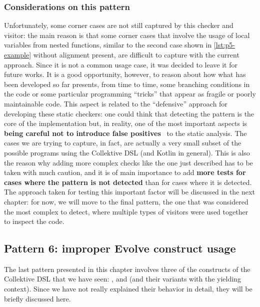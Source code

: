 \documentclass[12pt,a4paper,openright,twoside]{book}
\begin{document}
\subsubsection{Considerations on this pattern}

Unfortunately, some corner cases are not still captured by this checker and
visitor: the main reason is that some corner cases that involve the usage of
local variables from nested functions, similar to the second case shown in
\cref{lst:p5-example} without alignment present, are difficult to capture with
the current approach. Since it is not a common usage case, it was decided to
leave it for future works. It is a good opportunity, however, to reason about
how what has been developed so far presents, from time to time, some
branching conditions in the code or some particular programming ``tricks'' that
appear as fragile or poorly maintainable code. 
%
This aspect is related to the ``defensive'' approach for developing these static
checkers: one could think that detecting the pattern is the core of the
implementation but, in reality, one of the most important aspects is
\textbf{being careful not to introduce false
positives}~\cite{DBLP:journals/jss/LenarduzziPSLP23} to the static analysis.
%
The cases we are trying to capture, in fact, are actually a very small subset of
the possible programs using the Collektive \ac{DSL} (and Kotlin in general).
This is also the reason why adding more complex checks like the one just
described has to be taken with much caution, and it is of main importance to add
\textbf{more tests for cases where the pattern is not detected} than for cases
where it is detected.
%
The approach taken for testing this important factor will be discussed in the
next chapter: for now, we will move to the final pattern, the one that was
considered the most complex to detect, where multiple types of visitors were
used together to inspect the code.


 
\subsection{Pattern 6: improper Evolve construct usage}

The last pattern presented in this chapter involves three of the constructs of
the Collektive \ac{DSL} that we have seen: ,  and
 (and their variants with the yielding context). Since we have not
really explained their behavior in detail, they will be briefly discussed here.
\end{document}
